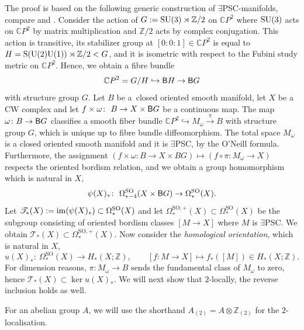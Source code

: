 \documentclass[10pt,a4paper]{amsart}
\numberwithin{equation}{section}
\newcommand{\Z}{\mathbb{Z}}
\newcommand{\C}{\mathbb{C}}
\newcommand{\SO}{\mathrm{SO}}
\newcommand{\SU}{\rm SU}
\newcommand{\sB}{{\sf B}}
\newcommand{\im}{{\rm im}}
\newcommand{\yes}{{\color {blue!70!black}$\exists$}{\sf PSC}}
\begin{document}
The proof is based on the following generic construction of \yes-manifolds, compare \cite{Stolz92} and \cite{Fuehring}.
Consider the action of $G := \SU(3) \rtimes \Z/2$ on $\C P^2$ where $\SU(3)$ acts on $\C P^2$ by matrix multiplication and $\Z/2$ acts by complex conjugation.
This action is transitive, its stabilizer group at $[0:0:1] \in \C P^2$ is equal to $H = {\rm S}({\rm U}(2) {\rm U}(1)) \rtimes \Z/2 < G$, and it is isometric with respect to the Fubini study metric on $\C P^2$.
Hence, we obtain a fibre bundle
\begin{equation} \label{universal}
 \C P^2 = G/ H \hookrightarrow \sB H \to \sB G
\end{equation}
with structure group $G$.
Let $B$ be a~closed oriented smooth manifold, let $X$ be a CW complex and let $
 f \times \omega \colon\ B \to X \times \sB G
$
be a continuous map.
The map $\omega \colon B \to \sB G$ classifies a smooth fiber bundle $\C P^2 \hookrightarrow M_{\omega} \stackrel{\pi}{\longrightarrow} B$ with structure group $G$, which is unique up to fibre bundle diffeomorphism.
The total space $M_{\omega}$ is a closed oriented smooth manifold and it is \yes, by the O'Neill formula.
Furthermore, the assignment $(f \times \omega \colon B \to X \times BG) \mapsto (f \circ \pi \colon M_\omega \to X)$ respects the oriented bordism relation, and we obtain a group homomorphism which is natural in $X$,
\begin{equation} \label{psi}
 \psi(X)_* \colon\ \Omega^{\SO}_{*-4} (X \times \sB G) \to \Omega^{\SO}_{*}(X).
\end{equation}
Let $\mathscr{T}_*(X) := \im ( \psi(X)_*) \subset \Omega^{\SO}_{*}(X)$ and let $ \Omega^{\SO, +}_*( X) \subset \Omega_*^{\SO}(X)$ be the subgroup consisting of oriented bordism classes $[M \to X]$ where $M$ is \yes.
We obtain
$
 \mathscr{T}_*(X) \subset \Omega^{\SO,+}_*(X)$.
Now consider the {\em homological orientation}, which is natural in $X$,
\begin{equation} \label{homor}
 u(X)_* \colon\ \Omega^{\SO}_*(X) \to H_*(X; \Z), \qquad [f \colon M \to X] \mapsto f_*([M]) \in H_*(X; \Z).
\end{equation}
For dimension reasons, $\pi \colon M_\omega \to B$ sends the fundamental class of $M_\omega$ to zero, hence
$
 \mathscr{T}_*(X) \subset \ker u(X)_*$.
We will next show that $2$-locally, the reverse inclusion holds as well.

For an abelian group $A$, we will use the shorthand $A_{(2)} = A \otimes \Z_{(2)}$ for the $2$-localisation.
\end{document}
